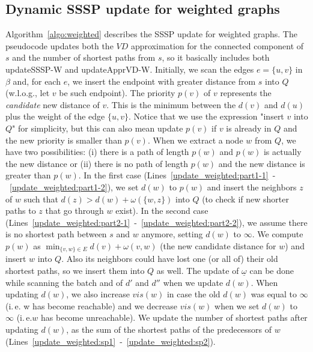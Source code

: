 \documentclass[english]{llncs}
\newcommand{\ie}{i.\,e.\xspace}
\newcommand{\vd}{$\mathit{VD}$\xspace}
\newcommand{\upvd}{\textsf{updateApprVD-W}\xspace}
\newcommand{\sssp}{\textsf{updateSSSP-W}\xspace}
\begin{document}
\subsection{Dynamic SSSP update for weighted graphs}
Algorithm~\ref{algo:weighted} describes the SSSP update for weighted graphs. The pseudocode updates both the \vd approximation for the connected component of $s$ and the number of shortest paths from $s$, so it basically includes both \sssp and \upvd.
Initially, we scan the edges $e =\{u,v\}$ in $\beta$ and, for each $e$, we insert the endpoint with greater distance from $s$ into $Q$ (w.l.o.g., let $v$ be such endpoint). The priority $p(v)$ of $v$ represents the \textit{candidate} new distance of $v$. This is the minimum between the $d(v)$ and $d(u)$ plus the weight of the edge $\{u, v\}$. Notice that we use the expression "insert $v$ into $Q$" for simplicity, but this can also mean update $p(v)$ if $v$ is already in $Q$ and the new priority is smaller than $p(v)$. 
When we extract a node $w$ from $Q$, we have two possibilities: (i) there is a path of length $p(w)$ and $p(w)$ is actually the new distance or (ii) there is no path of length $p(w)$ and the new distance is greater than $p(w)$. In the first case (Lines~\ref{update_weighted:part1-1}~-~\ref{update_weighted:part1-2}), we set $d(w)$ to $p(w)$ and insert the neighbors $z$ of $w$ such that $d(z)>d(w)+\omega(\{w,z\})$ into $Q$ (to check if new shorter paths to $z$ that go through $w$ exist). In the second case (Lines~\ref{update_weighted:part2-1}~-~\ref{update_weighted:part2-2}), we assume there is no shortest path between $s$ and $w$ anymore, setting $d(w)$ to $\infty$. We compute $p(w)$ as $\min_{\{v,w\}\in E} d(v) + \omega{(v,w)}$ (the new candidate distance for $w$) and insert $w$ into $Q$. Also its neighbors could have lost one (or all of) their old shortest paths, so we insert them into $Q$ as well. The update of $\underline{\omega}$ can be done while scanning the batch and of $d'$ and $d''$ when we update $d(w)$. When updating $d(w)$, we also increase $vis(w)$ in case the old $d(w)$ was equal to $\infty$ (\ie w has become reachable) and we decrease $vis(w)$ when we set $d(w)$ to $\infty$ (\ie $w$ has become unreachable). We update the number of shortest paths after updating $d(w)$, as the sum of the shortest paths of the predecessors of $w$ (Lines~\ref{update_weighted:sp1}~-~\ref{update_weighted:sp2}).
\end{document}
